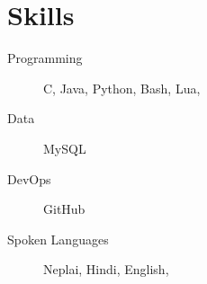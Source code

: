 \documentclass[11pt]{article} %
\begin{document}
\section{Skills}
\begin{description}
  \item[Programming]  C, Java, Python, Bash, Lua,
  \item[Data] MySQL
  \item[DevOps] GitHub
  \item[Spoken Languages] Neplai, Hindi, English,
\end{description}
\end{document}
